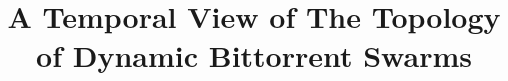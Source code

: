 \documentclass[10pt,conference,letterpaper,final]{IEEEtran}
\begin{document}


%
\title{A Temporal View of The Topology of Dynamic Bittorrent Swarms}




\end{document}
